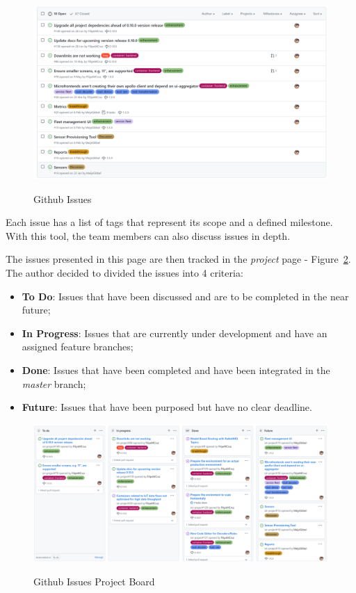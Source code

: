 \begin{figure}[H]
    \centering
    \resizebox{\columnwidth}{!}
    {
       \includegraphics{assets/figures/github-2.png}
    }
    \caption[Github Issues]{Github Issues}
    \label{fig:implementation:decisions:issues:board}
\end{figure}

Each issue has a list of tags that represent its scope and a defined milestone. With this tool, the team members can also discuss issues in depth.

The issues presented in this page are then tracked in the \textit{project} page - Figure~\ref{fig:implementation:decisions:issues:project}. The author decided to divided the issues into 4 criteria:

\begin{itemize}
    \item \textbf{To Do}: Issues that have been discussed and are to be completed in the near future;
    \item \textbf{In Progress}: Issues that are currently under development and have an assigned feature branches;
    \item \textbf{Done}: Issues that have been completed and have been integrated in the \textit{master} branch;
    \item \textbf{Future}: Issues that have been purposed but have no clear deadline.
\end{itemize}

\begin{figure}[H]
    \centering
    \resizebox{\columnwidth}{!}
    {
       \includegraphics{assets/figures/github.png}
    }
    \caption[Github Issues Project Board]{Github Issues Project Board}
    \label{fig:implementation:decisions:issues:project}
\end{figure}

